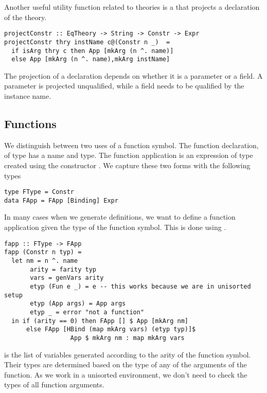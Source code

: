 Another useful utility function related to theories is a  that projects a declaration of the theory. 
\begin{verbatim}
projectConstr :: EqTheory -> String -> Constr -> Expr 
projectConstr thry instName c@(Constr n _)  =
  if isArg thry c then App [mkArg (n ^. name)]
  else App [mkArg (n ^. name),mkArg instName]
\end{verbatim}
The projection of a declaration depends on whether it is a parameter or a field. A parameter is projected unqualified, while a field needs to be qualified by the instance name. 

\subsection{Functions}
We distinguish between two uses of a function symbol. The function declaration, of type  has a name and type. The function application is an expression of type  created using the constructor . We capture these two forms with the following types 
\begin{verbatim}
type FType = Constr
data FApp = FApp [Binding] Expr
\end{verbatim}

In many cases when we generate definitions, we want to define a function application given the type of the function symbol. This is done using . 
\begin{verbatim}
fapp :: FType -> FApp
fapp (Constr n typ) =
  let nm = n ^. name
       arity = farity typ
       vars = genVars arity
       etyp (Fun e _) = e -- this works because we are in unisorted setup
       etyp (App args) = App args
       etyp _ = error "not a function"
  in if (arity == 0) then FApp [] $ App [mkArg nm]
      else FApp [HBind (map mkArg vars) (etyp typ)]$
                  App $ mkArg nm : map mkArg vars       
\end{verbatim}
 is the list of variables generated according to the arity of the function symbol. Their types are determined based on the type of any of the arguments of the function. As we work in a unisorted environment, we don't need to check the types of all function arguments. 

